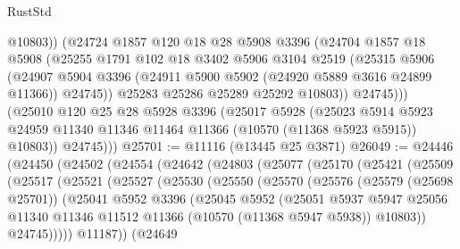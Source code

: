 \begin{lexlean}{RustStd}
\begin{coremodule}
                @10803))
            (@24724
              @1857
              @120
              @18
              @28
              @5908
              @3396
              (@24704
                @1857
                @18
                @5908
                (@25255
                  @1791
                  @102
                  @18
                  @3402
                  @5906
                  @3104
                  @2519
                  (@25315
                    @5906
                    (@24907
                      @5904
                      @3396
                      (@24911 @5900 @5902 (@24920 @5889 @3616 @24899 @11366))
                      @24745))
                  @25283
                  @25286
                  @25289
                  @25292
                  @10803))
              @24745)))
        (@25010
          @120
          @25
          @28
          @5928
          @3396
          (@25017
            @5928
            (@25023
              @5914
              @5923
              @24959
              @11340
              @11346
              @11464
              @11366
              (@10570 (@11368 @5923 @5915))
              @10803))
          @24745)))
@25701 := @11116 (@13445 @25 @3871)
@26049 := @24446
    (@24450
      (@24502
        (@24554
          (@24642
            (@24803
              (@25077
                (@25170
                  (@25421
                    (@25509
                      (@25517
                        (@25521
                          (@25527
                            (@25530
                              (@25550
                                (@25570
                                  (@25576
                                    (@25579 (@25698 @25701))
                                    (@25041
                                      @5952
                                      @3396
                                      (@25045
                                        @5952
                                        (@25051
                                          @5937
                                          @5947
                                          @25056
                                          @11340
                                          @11346
                                          @11512
                                          @11366
                                          (@10570 (@11368 @5947 @5938))
                                          @10803))
                                      @24745)))))
                            @11187))
                        (@24649

\end{coremodule}
\end{lexlean}
